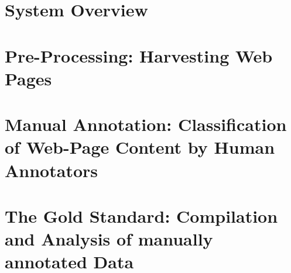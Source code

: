 

\title{\mytitle}


  \maketitle
  

  \begin{spacing}{1.1}
  \tableofcontents
  \end{spacing}
  \newpage
  \pagestyle{plain}

  

  	\section{\label{sec:systemoverview}System Overview} 
  	
	
	\section{\label{sec:preprocessing}Pre-Processing: Harvesting Web Pages}
	
	
	\section{\label{sec:manualannotation}Manual Annotation: Classification of Web-Page Content by Human Annotators}
	
	
	\section{\label{sec:goldstandard}The Gold Standard: Compilation and Analysis of manually annotated Data}
	
	
    
    \clearpage
    

